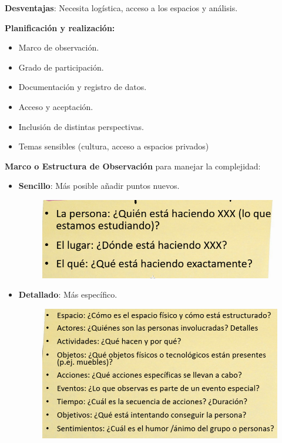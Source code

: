 \documentclass[12pt]{report} %
\begin{document}
\textbf{Desventajas}: Necesita logística, acceso a los espacios y
análisis.

\textbf{Planificación y realización:}

\begin{itemize}
  \item Marco de observación.
  \item Grado de participación.
  \item Documentación y registro de datos.
  \item Acceso y aceptación.
  \item Inclusión de distintas perspectivas.
  \item Temas sensibles (cultura, acceso a espacios privados)
\end{itemize}

\textbf{Marco o Estructura de Observación} para manejar la complejidad:
\begin{itemize}
  \item \textbf{Sencillo}: Más posible añadir puntos nuevos.
  \begin{figure}[H]
    {\includegraphics[scale=.3]{Untitled 1.png}}
  \end{figure}
  \item \textbf{Detallado}: Más específico.
  \begin{figure}[H]
    {\includegraphics[scale=.25]{Untitled 2.png}}
  \end{figure}
\end{itemize}
\end{document}
